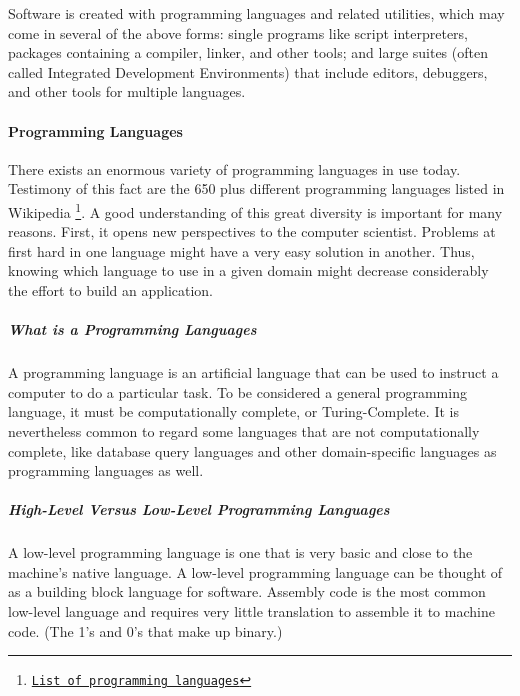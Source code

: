 Software is created with programming languages and related utilities, which may come in several of the above forms: single programs like script interpreters, packages containing a compiler, linker, and other tools; and large suites (often called Integrated Development Environments) that include editors, debuggers, and other tools for multiple languages. 


\paragraph*{Programming Languages}
\hfill \break
There exists an enormous variety of programming languages in use today. Testimony of this fact are the 650 plus different programming languages listed in Wikipedia \footnote{\href{http://en.wikipedia.org/wiki/List_of_programming_languages}{\texttt{List of programming languages}}}. A good understanding of this great diversity is important for many reasons. First, it opens new perspectives to the computer scientist. Problems at first hard in one language might have a very easy solution in another. Thus, knowing which language to use in a given domain might decrease considerably the effort to build an application.



\subparagraph*{What is a Programming Languages}
\hfill \break
A programming language is an artificial language that can be used to instruct a computer to do a particular task. To be considered a general programming language, it must be computationally complete, or Turing-Complete. It is nevertheless common to regard some languages that are not computationally complete, like database query languages and other domain-specific languages as programming languages as well.

\subparagraph*{High-Level Versus Low-Level Programming Languages}
\hfill \break
A low-level programming language is one that is very basic and close to the machine's native language. A low-level programming language can be thought of as a building block language for software. Assembly code is the most common low-level language and requires very little translation to assemble it to machine code. (The 1's and 0's that make up binary.)

